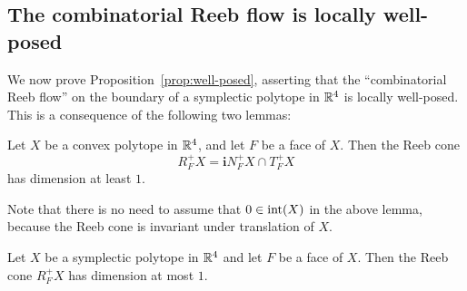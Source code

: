 \subsection{The combinatorial Reeb flow is locally well-posed}
\label{sec:wp}

We now prove Proposition~\ref{prop:well-posed}, asserting that the ``combinatorial Reeb flow'' on the boundary of a symplectic polytope in ${\mathbb R}^4$ is locally well-posed. This is a consequence of the following two lemmas:

\begin{lemma}
\label{lem:wp1}
Let $X$ be a convex polytope in ${\mathbb R}^4$, and let $F$ be a face of $X$. Then the Reeb cone
\[
R_F^+X = {\mathbf i}N_F^+X\cap T_F^+X
\]
has dimension at least $1$.
\end{lemma}

Note that there is no need to assume that $0\in\operatorname{int}(X)$ in the above lemma, because the Reeb cone is invariant under translation of $X$.

\begin{lemma}
\label{lem:wp2}
Let $X$ be a symplectic polytope in ${\mathbb R}^4$ and let $F$ be a face of $X$. Then the Reeb cone $R_F^+X$ has dimension at most $1$.
\end{lemma}

